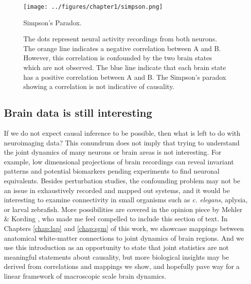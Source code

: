 \begin{figure}[htbp]
	\centering
	\texttt{[image: ../figures/chapter1/simpson.png]}
	\caption{Simpson's Paradox.}
	\caption*{The dots represent neural activity recordings from both neurons. The orange line indicates a negative correlation between A and B. However, this correlation is confounded by the two brain states which are not observed. The blue line indicate that each brain state has a positive correlation between A and B. The Simpson's paradox showing a correlation is not indicative of causality.}
	\label{fig:simpson}
\end{figure}

\subsection{Brain data is still interesting}
If we do not expect causal inference to be possible, then what is left to do with neuroimaging data? This conundrum does not imply that trying to understand the joint dynamics of many neurons or brain areas is not interesting. For example, low dimensional projections of brain recordings can reveal invariant patterns \cite{bruno_spiral_2017,gordon_precision_2017} and potential biomarkers \cite{marceau_biomarker_2018,desowska_dynamics_2019,beijers_data-driven_2019} pending experiments to find neuronal equivalents. Besides perturbation studies, the confounding problem may not be an issue in exhaustively recorded and mapped out systems, and it would be interesting to examine connectivity in small organisms such as \emph{c. elegans}, aplysia, or larval zebrafish. More possibilities are covered in the opinion piece by Mehler \& Kording \cite{mehler_lure_2020}, who made me feel compelled to include this section of text.  In Chapters \ref{chap:lap} and \ref{chap:sgm} of this work, we showcase mappings between anatomical white-matter connections to joint dynamics of brain regions. And we use this introduction as an opportunity to state that joint statistics are not meaningful statements about causality, but more biological insights may be derived from correlations and mappings we show, and hopefully pave way for a linear framework of macroscopic scale brain dynamics.

